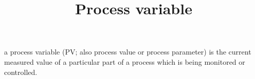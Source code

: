 \documentclass[a4paper]{article}
\title{Process variable}
\date{}
\begin{document}
\maketitle
    a process variable (PV; also process value or process parameter) is the current measured value of a particular part of a process which is being monitored or controlled. 
\end{document}
